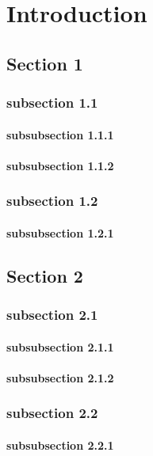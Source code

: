 
\chapter{Introduction}
\label{chp:intro}

\section{Section 1}
\subsection{subsection 1.1}
\subsubsection{subsubsection 1.1.1}
\subsubsection{subsubsection 1.1.2}
\subsection{subsection 1.2}
\subsubsection{subsubsection 1.2.1}

\section{Section 2}
\subsection{subsection 2.1}
\subsubsection{subsubsection 2.1.1}
\subsubsection{subsubsection 2.1.2}
\subsection{subsection 2.2}
\subsubsection{subsubsection 2.2.1}